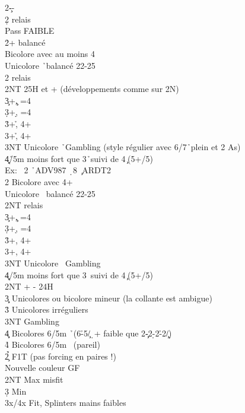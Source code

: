 \documentclass[a4paper]{article}
\begin{document}
\begin{bidtable}
2\c--\+\\
2\d \> relais\+\\
Pass \> FAIBLE \d \\
2\h {}+ balancé\\
\>Bicolore avec au moins 4\h \\
\>Unicolore \h\ balancé 22-25\+\\
2\s \> relais\+\\
2NT \> 25H et + (développements comme sur 2N)\\
3\c {}+\c , =4\h \\
3\d {}+\d , =4\h \\
3\h {}+\h , 4+\c \\
3\s {}+\h , 4+\d \\
3NT \> Unicolore \h\ Gambling (style régulier avec 6/7\h\ plein et 2 As)\\
4\c\d {}\h /5m moins fort que 3\h\ suivi de 4\c\ (5+/5)\\
\>Ex: \s\ 2 \h\ ADV987 \d\ 8 \c\ ARDT2\-\-\\
2\s \> Bicolore avec 4+\s \\
\>Unicolore \s\ balancé 22-25\+\\
2NT \> relais\+\\
3\c {}+\c , =4\s \\
3\d {}+\d , =4\s \\
3\h {}+\s , 4+\c \\
3\s {}+\s , 4+\d \\
3NT \> Unicolore \s\ Gambling\\
4\c\d {}\s /5m moins fort que 3\s\ suivi de 4\c\ (5+/5)\-\-\\
2NT + - 24H\\
3\c\d \> Unicolores ou bicolore mineur (la collante est ambigue)\\
3\h\s \> Unicolores irréguliers\\
3NT \> Gambling \c \\
4\c\d \> Bicolores 6/5m \h\ (6\h -5\c /\d\ + faible que 2\c -2\d -2\h -2\c /\d )\\
4\h\s \> Bicolores 6/5m \s\ (pareil)\-\\
2\h{}\c \> F1T (pas forcing en paires !)\\
\>Nouvelle couleur GF\+\\
2NT \> Max misfit\\
3\d \> Min\\
3x/4x \> Fit, Splinters mains faibles\-\\

\end{bidtable}
\end{document}
